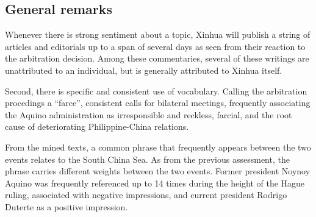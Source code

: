 \subsection{General remarks}

Whenever there is strong sentiment about a topic, Xinhua will publish a
string of articles and editorials up to a span of several days as seen
from their reaction to the arbitration decision. Among these
commentaries, several of these writings are unattributed to an
individual, but is generally attributed to Xinhua itself.

Second, there is specific and consistent use of vocabulary. Calling the
arbitration procedings a ``farce'', consistent calls for bilateral
meetings, frequently associating the Aquino administration as
irresponsible and reckless, farcial, and the root cause of
deteriorating Philippine-China relations.

From the mined texts, a common phrase that frequently appears between
the two events relates to the South China Sea. As from the previous
assessment, the phrase carries different weights between the two
events. Former president Noynoy Aquino was frequently referenced up to
14 times during the height of the Hague ruling, associated with
negative impressions, and current president Rodrigo Duterte as a
positive impression.

